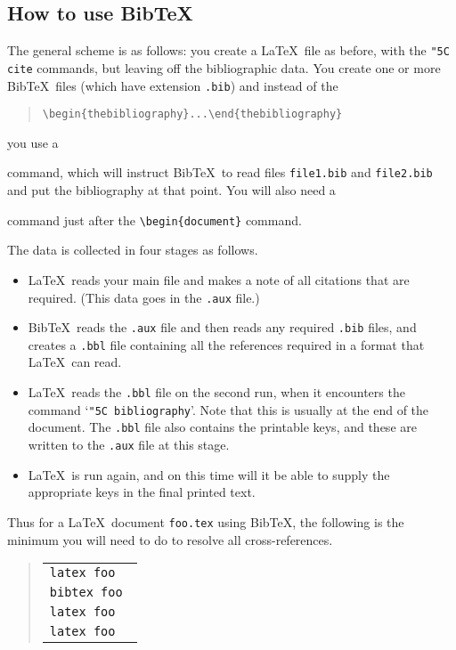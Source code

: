 \documentclass[a4paper]{article}
\newcommand{\fn}[1]{{\tt #1}}
\newcommand{\cn}[1]{{\tt \char"5C #1}}
\newcommand{\BibTeX}{{\sc Bib}\TeX}
\begin{document}
\subsection{How to use \BibTeX}

The general scheme is as follows:  you create a \LaTeX\ file as before,
with the \cn{cite} commands, but leaving off the bibliographic data.
You create one or more \BibTeX\ files (which have extension \fn{.bib})
and instead of the 
\begin{quote}
\verb|\begin{thebibliography}...\end{thebibliography}|
\end{quote}
you use a
\begin{quote}
\verb||
\end{quote}
command, which will instruct \BibTeX\ to read files \fn{file1.bib}
and \fn{file2.bib} and put the bibliography at that point.
You will also need a
\begin{quote}
\verb||
\end{quote}
command just after the \verb|\begin{document}| command.

The data is collected in four stages as follows.
\begin{itemize}
\item \LaTeX\ reads your main file and makes a note of all
citations that are required.  (This data goes in the \fn{.aux} 
file.)
\item \BibTeX\ reads the \fn{.aux} file and then reads any required
\fn{.bib} files, 
and creates a \fn{.bbl} file containing
all the references required in a format that \LaTeX\ can read.
\item \LaTeX\ reads the \fn{.bbl} file on the second run, when it
encounters the command `\cn{bibliography}'.  Note that this is usually
at the end of the document.  The \fn{.bbl} file also contains
the printable keys, and these are written to the \fn{.aux} file
at this stage.
\item \LaTeX\ is run again, and on this time will it be able
to supply the appropriate keys in the final printed text.
\end{itemize}

Thus for a \LaTeX\ document \fn{foo.tex} using \BibTeX, 
the following is the minimum
you will need to do to resolve all cross-references.
\begin{quote}
\begin{tabular}{l}
\tt latex foo \\
\tt bibtex foo \\
\tt latex foo \\
\tt latex foo
\end{tabular}
\end{quote}
\end{document}
